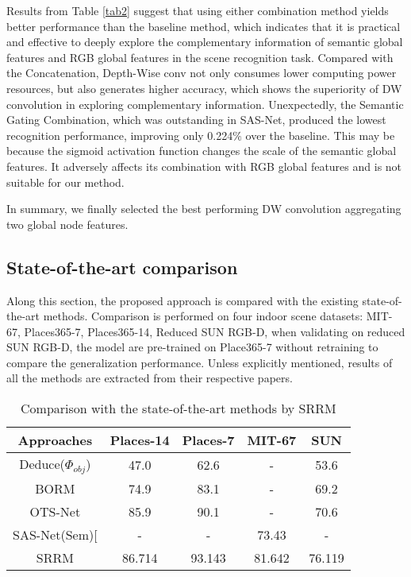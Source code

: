 \documentclass[conference]{IEEEtran}
\begin{document}
Results from Table \ref{tab2} suggest that using either combination method yields better performance than the baseline method, which indicates that it is practical and effective to deeply explore the complementary information of semantic global features and RGB global features in the scene recognition task. Compared with the Concatenation, Depth-Wise conv not only consumes lower computing power resources, but also generates higher accuracy, which shows the superiority of DW convolution in exploring complementary information. Unexpectedly, the Semantic Gating Combination, which was outstanding in SAS-Net, produced the lowest recognition performance, improving only 0.224$\%$ over the baseline. This may be because the sigmoid activation function changes the scale of the semantic global features. It adversely affects its combination with RGB global features and is not suitable for our method.

In summary, we finally selected the best performing DW convolution aggregating two global node features.

\subsection{State-of-the-art comparison}

Along this section, the proposed approach is compared with the existing state-of-the-art methods. Comparison is performed on four indoor scene datasets: MIT-67\cite{ref8}, Places365-7\cite{ref14}, Places365-14\cite{ref14}, Reduced SUN RGB-D\cite{ref30}, when validating on reduced SUN RGB-D, the model are pre-trained on Place365-7 without retraining to compare the generalization performance. Unless explicitly mentioned, results of all the methods are extracted from their respective papers.

\begin{table}[htbp]\centering
    \caption{Comparison with the state-of-the-art methods by SRRM}
    \begin{tabular}{ccccc}
    \hline
        \textbf{Approaches} & \textbf{Places-14} & \textbf{Places-7} & \textbf{MIT-67 }& \textbf{SUN}  \\ \hline
        Deduce(${\Phi _{obj}}$)\cite{ref18}  & 47.0 & 62.6 & - & 53.6  \\ 
        BORM\cite{ref20}  & 74.9 & 83.1 & - & 69.2  \\ 
        OTS-Net\cite{ref16}  & 85.9 & 90.1 & - & 70.6  \\ 
        SAS-Net(Sem)[\cite{ref17}  & - & - & 73.43 & -  \\ 
        SRRM & 86.714 & 93.143 & 81.642 & 76.119  \\ \hline
    \end{tabular}
    \label{tab3}
\end{table}
\end{document}
